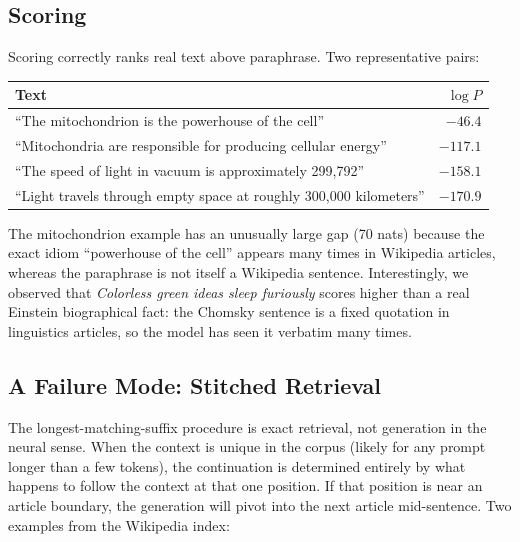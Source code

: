 \documentclass[11pt]{article}
\begin{document}
\subsection{Scoring}

Scoring correctly ranks real text above paraphrase. Two representative pairs:

\begin{table}[h]
\centering
\begin{tabular}{lr}
\toprule
Text & $\log P$ \\
\midrule
``The mitochondrion is the powerhouse of the cell''                    & $-46.4$ \\
``Mitochondria are responsible for producing cellular energy''         & $-117.1$ \\
\midrule
``The speed of light in vacuum is approximately 299{,}792''            & $-158.1$ \\
``Light travels through empty space at roughly 300{,}000 kilometers''  & $-170.9$ \\
\bottomrule
\end{tabular}
\end{table}

The mitochondrion example has an unusually large gap (70 nats) because the exact idiom ``powerhouse of the cell'' appears many times in Wikipedia articles, whereas the paraphrase is not itself a Wikipedia sentence. Interestingly, we observed that \emph{Colorless green ideas sleep furiously} scores higher than a real Einstein biographical fact: the Chomsky sentence is a fixed quotation in linguistics articles, so the model has seen it verbatim many times.

\subsection{A Failure Mode: Stitched Retrieval}

The longest-matching-suffix procedure is exact retrieval, not generation in the neural sense. When the context is unique in the corpus (likely for any prompt longer than a few tokens), the continuation is determined entirely by what happens to follow the context at that one position. If that position is near an article boundary, the generation will pivot into the next article mid-sentence. Two examples from the Wikipedia index:
\end{document}
